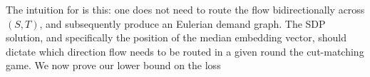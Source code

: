 \documentclass[letterpaper]{article}
\begin{document}
\begin{figure}[h]
\centering
\noindent{}
\label{fig:directed-round-cut}
\end{figure}

The intuition for \dirroundcut is this: one does not need to route the flow bidirectionally across $(S, T)$, and subsequently produce an Eulerian demand graph. The SDP solution, and specifically the position of the median embedding vector, should dictate which direction flow needs to be routed in a given round the cut-matching game. We now prove our lower bound on the loss
\end{document}
